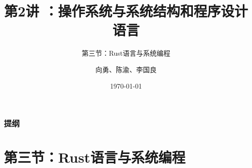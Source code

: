 


\title[第2讲]{第2讲 ：操作系统与系统结构和程序设计语言} %
\subtitle{第三节：Rust语言与系统编程}
\author{向勇、陈渝、李国良} %
\date{\today} %



\begin{frame}
\titlepage %
\end{frame}

\begin{frame}
\frametitle{提纲} %
\tableofcontents %
\end{frame}


\section{第三节：Rust语言与系统编程 } %

